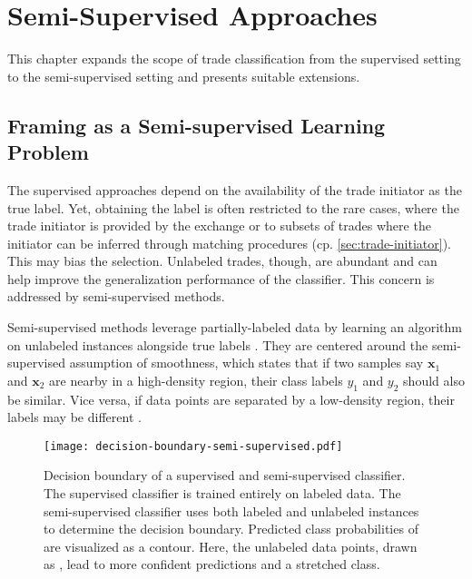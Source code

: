 \section{Semi-Supervised Approaches}\label{sec:semi-supervised-approaches}

This chapter expands the scope of trade classification from the supervised setting to the semi-supervised setting and presents suitable extensions.

\subsection{Framing as a Semi-supervised Learning Problem}\label{sec:problem-framing-2}

The supervised approaches depend on the availability of the trade initiator as the true label. Yet, obtaining the label is often restricted to the rare cases, where the trade initiator is provided by the exchange or to subsets of trades where the initiator can be inferred through matching procedures (cp. \cref{sec:trade-initiator}). This may bias the selection. Unlabeled trades, though, are abundant and can help improve the generalization performance of the classifier. This concern is addressed by semi-supervised methods.

Semi-supervised methods leverage partially-labeled data by learning an algorithm on unlabeled instances alongside true labels \autocite[\checkmark][2]{chapelleSemisupervisedLearning2006}. They are centered around the semi-supervised assumption of smoothness, which states that if two samples say $\mathbf{x}_{1}$ and $\mathbf{x}_{2}$ are nearby in a high-density region, their class labels $y_{1}$ and $y_{2}$ should also be similar. Vice versa, if data points are separated by a low-density region, their labels may be different \autocite[\checkmark][5]{chapelleSemisupervisedLearning2006}.

\begin{figure}[ht]
    \centering
    \texttt{[image: decision-boundary-semi-supervised.pdf]}
    \caption[Decision Boundary of Supervised and Semi-supervised Classifiers]{Decision boundary of a supervised and semi-supervised classifier. The supervised classifier is trained entirely on labeled data. The semi-supervised classifier uses both labeled and unlabeled instances to determine the decision boundary. Predicted class probabilities of  are visualized as a contour. Here, the unlabeled data points, drawn as , lead to more confident predictions and a stretched class.}
    \label{fig:supervised-semi-supervised}
\end{figure}

